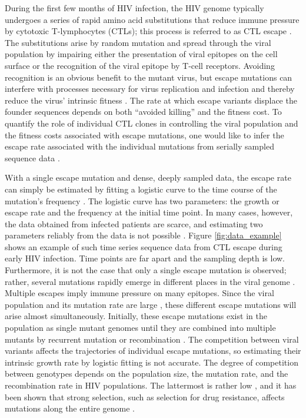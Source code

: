\documentclass{frontiers}
\begin{document}
\maketitle
During the first few months of HIV infection, the HIV genome typically
undergoes a series of rapid amino acid substitutions that reduce immune
pressure by cytotoxic T-lymphocytes (CTLs); this process is referred to as CTL escape
\citep{Mcmichael:2009p31614}. The substitutions arise by random mutation and
spread through the viral population by impairing either the presentation of viral epitopes
on the cell surface or the recognition of the viral epitope by T-cell
receptors. Avoiding recognition is an obvious benefit to the mutant virus, but
escape mutations can interfere with processes necessary for virus replication and
infection and thereby reduce the virus' intrinsic fitness \citep{Fernandez:2005p44304,Li:2007p43266,ganusov_fitness_2011,seki_ctl_2012}. The rate at which escape
variants displace the founder sequences depends on both ``avoided killing''
and the fitness cost. To quantify the role of individual CTL clones in
controlling the viral population and the fitness costs associated with escape
mutations, one would like to infer the escape rate associated
with the individual mutations from serially sampled sequence data 
\citep{Asquith:2006p28003,ganusov_fitness_2011}.

With a single escape mutation and dense, deeply sampled data, the escape rate
can simply be estimated by fitting a logistic curve to the time course of the
mutation's frequency \citep{Asquith:2006p28003,ganusov_fitness_2011}.
The logistic curve has two parameters: the growth or escape rate and the frequency
at the initial time point. In many cases, however, the data obtained from
infected patients are scarce, and estimating two parameters reliably from the data
is not possible \citep{ganusov_fitness_2011}. Figure \ref{fig:data_example} shows an example
of such time series sequence data from CTL escape during early HIV infection. Time
points are far apart and the sampling depth is low. Furthermore, it is not the case that only 
a single escape mutation is observed; rather,
several mutations rapidly emerge in different places in the viral genome
\citep{Goonetilleke:2009p42296,SalazarGonzalez:2009p35091}. Multiple escapes
imply immune pressure on many epitopes. Since the viral population and its
mutation rate are large \citep{Perelson:1996p23158,Mansky:1995p38971}, these
different escape mutations will arise almost simultaneously. Initially, these escape
mutations exist in the population as single mutant genomes until they are
combined into multiple mutants by recurrent mutation or recombination
\citep{ganusov_mathematical_2013,leviyang_computational_2013}. The competition 
between viral variants
affects the trajectories of individual escape mutations, so estimating their 
intrinsic growth rate by
logistic fitting is not accurate. The degree of competition between genotypes
depends on the population size, the mutation rate, and the recombination rate in
HIV populations. The lattermost is rather low
\citep{Neher:2010p32691,Batorsky:2011p40107}, and it has been shown that
strong selection, such as selection for drug resistance, affects mutations
along the entire genome \citep{Nijhuis:1998p44376}.
\end{document}

